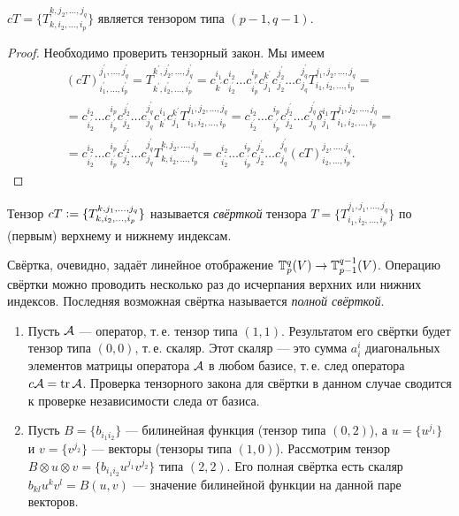 \begin{proposal}
    $cT = \{T_{k, i_2, \ldots, i_p}^{k, j_2, \ldots, j_q}\}$ является тензором типа $(p - 1, q - 1)$.
\end{proposal}

\begin{proof}
    Необходимо проверить тензорный закон. Мы имеем
    \begin{multline*}
        (cT)_{i_1^\prime, \ldots, i_p^\prime}^{j_1^\prime, \ldots, j_q^\prime} = T_{k^\prime, i_2^\prime, \ldots, i_p^\prime}^{k^\prime, j_2^\prime, \ldots, j_q^\prime} = c^{i_1}_{k^\prime}c^{i_2}_{i_2^\prime}\ldots c^{i_p}_{i^\prime_p}c^{k^\prime}_{j_1}c^{j_2^\prime}_{j_2}\ldots c^{j^\prime_q}_{j_q}T_{i_1, i_2, \ldots, i_p}^{j_1, j_2, \ldots, j_q} =\\ = c^{i_2}_{i_2^\prime}\ldots c^{i_p}_{i^\prime_p}c^{j_2^\prime}_{j_2}\ldots c^{j^\prime_q}_{j_q}c^{i_1}_{k^\prime}c^{k^\prime}_{j_1}T_{i_1, i_2, \ldots, i_p}^{j_1, j_2, \ldots, j_q} = c^{i_2}_{i_2^\prime}\ldots c^{i_p}_{i^\prime_p}c^{j_2^\prime}_{j_2}\ldots c^{j^\prime_q}_{j_q}\delta^{i_1}_{j_1}T_{i_1, i_2, \ldots, i_p}^{j_1, j_2, \ldots, j_q} =\\ = c^{i_2}_{i_2^\prime}\ldots c^{i_p}_{i^\prime_p}c^{j_2^\prime}_{j_2}\ldots c^{j^\prime_q}_{j_q}T_{k, i_2, \ldots, i_p}^{k, j_2, \ldots, j_q} = c^{i_2}_{i_2^\prime}\ldots c^{i_p}_{i^\prime_p}c^{j_2^\prime}_{j_2}\ldots c^{j^\prime_q}_{j_q}(cT)_{i_2, \ldots, i_p}^{j_2, \ldots, j_q}.
    \end{multline*}
\end{proof}

\begin{definition}
    Тензор $cT \vcentcolon = \{T_{k, i_2, \ldots, i_p}^{k, j_1, \ldots, j_q}\}$ называется \textit{свёрткой} тензора $T = \{T_{i_1, i_2, \ldots, i_p}^{j_1, j_1, \ldots, j_q}\}$ по (первым) верхнему и нижнему индексам.
\end{definition}

Свёртка, очевидно, задаёт линейное отображение $\mathbb{T}_p^q(V) \to \mathbb{T}_{p - 1}^{q - 1}(V)$. Операцию свёртки можно проводить несколько раз до исчерпания верхних или нижних индексов. Последняя возможная свёртка называется \textit{полной свёрткой}.

\begin{example}
    \begin{enumerate}
        \item Пусть $\mathcal{A}$ --- оператор, т.\,е. тензор типа $(1, 1)$. Результатом его свёртки будет тензор типа $(0, 0)$, т.\,е. скаляр. Этот скаляр --- это сумма $a^i_i$ диагональных элементов матрицы оператора $\mathcal{A}$ в любом базисе, т.\,е. след оператора $c\mathcal{A} = \operatorname{tr}\mathcal{A}$. Проверка тензорного закона для свёртки в данном случае сводится к проверке независимости следа от базиса.
        \item Пусть $B = \{b_{i_1i_2}\}$ --- билинейная функция (тензор типа $(0, 2)$), а $u = \{u^{j_1}\}$ и $v = \{v^{j_2}\}$ --- векторы (тензоры типа $(1, 0)$). Рассмотрим тензор $B \otimes u \otimes v = \{b_{i_1i_2}u^{j_1}v^{j_2}\}$ типа $(2, 2)$. Его полная свёртка есть скаляр $b_{kl}u^kv^l = B(u, v)$ --- значение билинейной функции на данной паре векторов.
    \end{enumerate}
\end{example}

